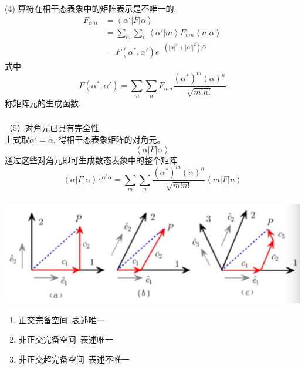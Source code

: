 \begin{frame} 
\frametitle{}
      (4) 算符在相干态表象中的矩阵表示是不唯一的.
    \[\begin{aligned}
         F_{\alpha' \alpha} &= \left\langle \alpha' | F |\alpha \right\rangle \\ 
         &= \sum_m \sum_n  \left\langle \alpha' |m \right\rangle F_{mn} \left\langle n |\alpha \right\rangle \\
         &= F(\alpha^*, \alpha')e^{-(\left|\alpha\right|^2+ \left|\alpha'\right|^2)/2}  
    \end{aligned} \]
      式中 \[F(\alpha^*, \alpha')= \sum_m \sum_n F_{mn} \frac{(\alpha^*)^m (\alpha)^n}{\sqrt{m! n!}}\]
     称矩阵元的生成函数.
\end{frame}

\begin{frame} 
\frametitle{}
    （5）对角元已具有完全性 \\ {\vspace*{0.6em}}
      上式取$\alpha'=\alpha$, 得相干态表象矩阵的对角元。
      \[ \left\langle \alpha|F|\alpha \right\rangle\]
      通过这些对角元即可生成数态表象中的整个矩阵
      \[ \left\langle \alpha|F|\alpha \right\rangle e^{\alpha^* \alpha} = \sum_m \sum_n  \frac{(\alpha^*)^m (\alpha)^n}{\sqrt{m! n!}} \left\langle m|F|n \right\rangle\]
\end{frame}

\begin{frame} 
 \frametitle{}
        \begin{center}
             \includegraphics[width=1.0\textwidth]{figs/2022-05-11-11-10-06.png}
        \end{center}
    \begin{enumerate}
        \item 正交完备空间~表述唯一
        \item 非正交完备空间~表述唯一
        \item 非正交超完备空间~表述不唯一
    \end{enumerate}
\end{frame}

